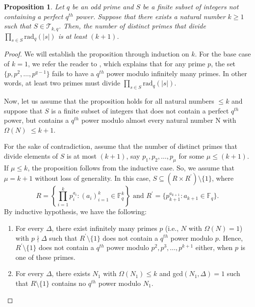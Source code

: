 \documentclass[12pt]{amsart}
\newtheorem{proposition}[theorem]{Proposition}
\begin{document}
\begin{proposition}
Let $q$ be an odd prime and $S$ be a finite subset of integers not containing a perfect $q^{th}$ power. Suppose that there exists a natural number $k \geq 1$ such that $S \in\mathcal{T}_{k,q}$. Then, the number of distinct primes that divide $\prod_{s\in S} \text{rad}_{q}(\lvert s\rvert)$ is at least $(k + 1)$. \label{numberofprimes}
\end{proposition}

\begin{proof}
We will establish the proposition through induction on $k$. For the base case of $k = 1$, we refer the reader to \cite[pp. 5]{mishra2023prime}, which explains that for any prime $p$, the set $\{p, p^{2}, \ldots, p^{q-1}\}$ fails to have a $q^{th}$ power modulo infinitely many primes. In other words, at least two primes must divide $\prod_{s\in S} \text{rad}_{q}(|s|)$.

Now, let us assume that the proposition holds for all natural numbers $\leq k$ and suppose that $S$ is a finite subset of integers that does not contain a perfect $q^{th}$ power, but contains a $q^{th}$ power modulo almost every natural number N with $\Omega(N)$ $\leq k + 1$. 

For the sake of contradiction, assume that the number of distinct primes that divide elements of $S$ is at most $(k + 1)$, say $p_{1}, p_{2}, \ldots, p_{\mu}$ for some $\mu \leq (k+1)$. If $\mu \leq k$, the proposition follows from the inductive case. So, we assume that $\mu = k + 1$ without loss of generality. In this case, $S \subseteq ( R \times R^{\prime} ) \setminus\{1\}$, where \[ R = \left\{ \prod_{i=1}^{k} p_{i}^{a_{i}} : (a_{i})_{i=1}^{k} \in\mathbb{F}_{q}^{k} \right\} \text{ and } R^{\prime} = \{ p_{k+1}^{a_{k+1}} : a_{k+1} \in\mathbb{F}_{q} \}. \] By inductive hypothesis, we have the following: 
\begin{enumerate}
    \item For every $\Delta$, there exist infinitely many primes $p$ (i.e., $N$ with $\Omega(N) = 1$) with $p \nmid \Delta$ such that $R^{\prime}\setminus\{1\}$ does not contain a $q^{th}$ power modulo $p$. Hence, $R^{\prime}\setminus\{1\}$ does not contain a $q^{th}$ power modulo $p^{2}, p^{3}, \ldots, p^{k+1}$ either, when $p$ is one of these primes. 

    \item For every $\Delta$, there exists $N_{1}$ with $\Omega(N_{1}) \leq k$ and gcd$(N_{1}, \Delta) = 1$ such that $R\setminus\{1\}$ contains no $q^{th}$ power modulo $N_{1}$. 


\end{enumerate}
\end{proof}
\end{document}
